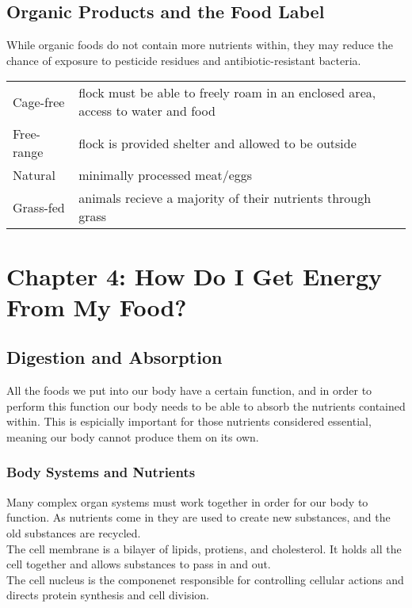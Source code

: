 \documentclass[letterpaper, 11pt]{article}
\begin{document}
\subsection{Organic Products and the Food Label}
\label{sec:org2f9cbdd}
While organic foods do not contain more nutrients within, they may reduce the chance of exposure to pesticide residues and antibiotic-resistant bacteria.\\
\begin{center}
\begin{tabular}{ll}
Cage-free & flock must be able to freely roam in an enclosed area, access to water and food\\
Free-range & flock is provided shelter and allowed to be outside\\
Natural & minimally processed meat/eggs\\
Grass-fed & animals recieve a majority of their nutrients through grass\\
\end{tabular}
\end{center}
\section{Chapter 4: How Do I Get Energy From My Food?}
\label{sec:org69d2285}
\subsection{Digestion and Absorption}
\label{sec:org7810a05}
All the foods we put into our body have a certain function, and in order to perform this function our body needs to be able to absorb the nutrients contained within. This is espicially important for those nutrients considered essential, meaning our body cannot produce them on its own.\\
\subsubsection{Body Systems and Nutrients}
\label{sec:orgc20ffc4}
Many complex organ systems must work together in order for our body to function. As nutrients come in they are used to create new substances, and the old substances are recycled.\\
The cell membrane is a bilayer of lipids, protiens, and cholesterol. It holds all the cell together and allows substances to pass in and out.\\
The cell nucleus is the componenet responsible for controlling cellular actions and directs protein synthesis and cell division.\\
\end{document}
